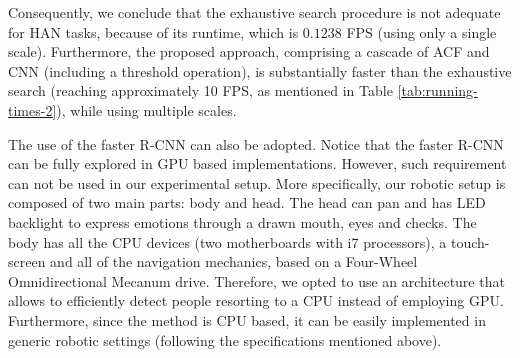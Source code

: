 \documentclass[5p,time]{elsarticle}
\begin{document}
Consequently, we conclude that the exhaustive search procedure is not adequate for HAN tasks, because of its runtime, which is $0.1238$ FPS (using only a single scale). Furthermore, the proposed approach, comprising a cascade of ACF and CNN (including a threshold operation), is substantially faster than the exhaustive search (reaching approximately 10 FPS, as mentioned in Table \ref{tab:running-times-2}), while using multiple scales.

The use of the faster R-CNN can also be adopted. Notice that the faster R-CNN can be fully explored in GPU based implementations. However, such requirement can not be used in our experimental setup. More specifically, our robotic setup is composed of two main parts: body and head. The head can pan and has LED backlight to express emotions through a drawn mouth, eyes and checks. The body has all the CPU devices (two motherboards with i7 processors), a touch-screen and all of the navigation mechanics, based on a Four-Wheel Omnidirectional Mecanum drive. Therefore, we opted to use an architecture that allows to efficiently detect people resorting to a CPU instead of employing GPU. Furthermore, since the method is CPU based, it can be easily implemented in generic robotic settings (following the specifications mentioned above).
\end{document}
